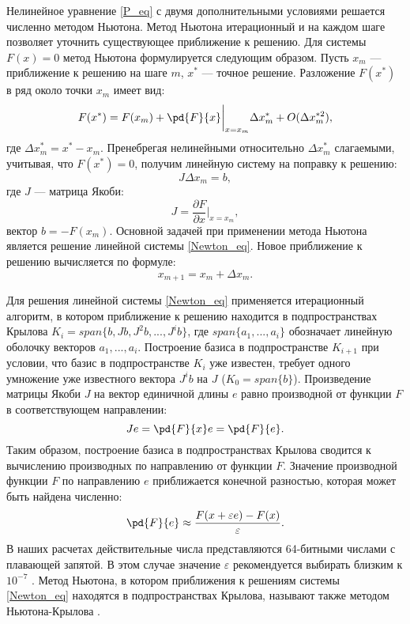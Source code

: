 Нелинейное уравнение \eqref{P_eq} с двумя дополнительными условиями решается численно методом Ньютона. Метод Ньютона итерационный и на каждом шаге позволяет уточнить существующее приближение к решению. Для системы $F(x) = 0$ метод Ньютона формулируется следующим образом. Пусть $x_m$ --- приближение к решению на шаге $m$, $x^*$ --- точное решение. Разложение $F(x^*)$ в ряд около точки $x_m$ имеет вид:
\begin{equation}
F(x^*) = F(x_m) + \pd{F}{x}\bigg|_{x=x_m} \Delta x_m^* + O(\Delta x_m^{*2}), 
\end{equation}
где $\Delta x_m^* = x^* - x_m$. Пренебрегая нелинейными относительно $\Delta x_m^*$ слагаемыми, учитывая, что $F(x^*) = 0$, получим линейную систему на поправку к решению:
\begin{equation}\label{Newton_eq}
J \Delta x_m = b,
\end{equation}
где $J$ --- матрица Якоби:
$$
J = \frac{\partial F}{\partial x}\bigg|_{x = x_m},
$$
вектор $b = - F(x_m)$. 
Основной задачей при применении метода Ньютона является решение линейной системы \eqref{Newton_eq}. Новое приближение к решению вычисляется по формуле: 
\begin{equation} \label{end_NK_eq}
x_{m+1} = x_m + \Delta x_m. 
\end{equation}

Для решения линейной системы \eqref{Newton_eq} применяется итерационный алгоритм, в котором приближение к решению находится в подпространствах Крылова $K_i = span\{b, Jb, J^2b, ... , J^ib\}$, где $span\{a_1, ..., a_i\}$ обозначает линейную оболочку векторов $a_1, ..., a_i$. Построение базиса в подпространстве $K_{i+1}$ при условии, что базис в подпространстве $K_i$ уже известен, требует одного умножение уже известного вектора $J^ib$ на $J$ ($K_0 = span\{b\}$). Произведение матрицы Якоби $J$ на вектор единичной длины $e$ равно производной от функции $F$ в соответствующем направлении:
\begin{equation} \label{Je_eq}
Je = \pd{F}{x} e = \pd{F}{e}. 
\end{equation}
Таким образом, построение базиса в подпространствах Крылова сводится к вычислению производных по направлению от функции $F$. Значение производной функции $F$ по направлению $e$ приближается конечной разностью, которая может быть найдена численно:
\begin{equation}\label{fd_eq}
\pd{F}{e} \approx \frac{F(x + \varepsilon e) - F(x)}{\varepsilon}.
\end{equation}
В наших расчетах действительные числа представляются 64-битными числами с плавающей запятой. В этом случае значение $\varepsilon$ рекомендуется выбирать близким к $10^{-7}$ \cite{Viswanath2007}. Метод Ньютона, в котором приближения к решениям системы \eqref{Newton_eq} находятся в подпространствах Крылова, называют также методом Ньютона-Крылова \cite{Sanchez2004}. 

